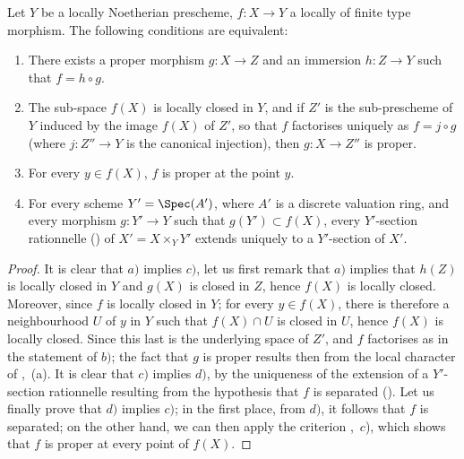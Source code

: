 \begin{corollary}[15.7.6]
\label{IV.15.7.6}
Let $Y$ be a locally Noetherian prescheme, $f:X\to Y$ a locally of finite type morphism.
The following conditions are equivalent:
\begin{enumerate}[label=\emph{\alph*)}]
  \item There exists a proper morphism $g:X\to Z$ and an immersion $h:Z\to Y$ such that $f=h\circ g$.
  \item The sub-space $f(X)$ is locally closed in $Y$, and if $Z'$ is the sub-prescheme of $Y$ induced by the image $f(X)$ of $Z'$, so that $f$ factorises uniquely as $f=j\circ g$ (where $j:Z''\to Y$ is the canonical injection), then $g:X\to Z''$ is proper.
  \item For every $y\in f(X)$, $f$ is proper at the point $y$.
  \item For every scheme $Y'=\Spec(A')$, where $A'$ is a discrete valuation ring, and every morphism $g:Y'\to Y$ such that $g(Y')\subset f(X)$, every $Y'$-section rationnelle () of $X'=X\times_Y Y'$ extends uniquely to a $Y'$-section of $X'$.
\end{enumerate}
\end{corollary}

\begin{proof}
It is clear that $a)$ implies $c)$, let us first remark that $a)$ implies that $h(Z)$ is locally closed in $Y$ and $g(X)$ is closed in $Z$, hence $f(X)$ is locally closed.
Moreover, since $f$ is locally closed in $Y$; for every $y\in f(X)$, there is therefore a neighbourhood $U$ of $y$ in $Y$ such that $f(X)\cap U$ is closed in $U$, hence $f(X)$ is locally closed.
Since this last is the underlying space of $Z'$, and $f$ factorises as in the statement of $b)$; the fact that $g$ is proper results then from the local character of ,~(a).
It is clear that $c)$ implies $d)$, by the uniqueness of the extension of a $Y'$-section rationnelle resulting from the hypothesis that $f$ is separated ().
Let us finally prove that $d)$ implies $c)$; in the first place, from $d)$, it follows that $f$ is separated; on the other hand, we can then apply the criterion ,~$c$), which shows that $f$ is proper at every point of $f(X)$.
\end{proof}

